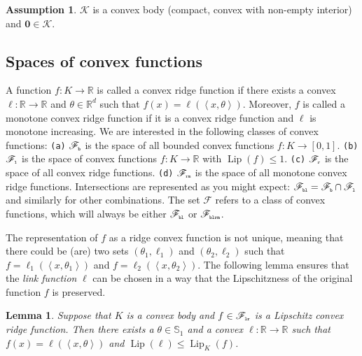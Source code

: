 \documentclass[letter, 12pt]{report}
\newcommand{\pr}{\text{\tiny\texttt{r}}}
\newcommand{\pb}{\text{\tiny\texttt{b}}}
\newcommand{\pl}{\text{\tiny\texttt{l}}}
\renewcommand{\pm}{\text{\tiny\texttt{m}}}
\newcommand{\R}{\mathbb R}
\newcommand{\ip}[1]{\left \langle #1 \right \rangle}
\newcommand{\sphere}{\mathbb{S}}
\newcommand{\cK}{\mathcal K}
\newcommand{\sF}{\mathscr F}
\newcommand{\zeros}{ \bm 0}
\newcommand{\lip}{\operatorname{Lip}}
\newcommand{\1}{\mathbf{1}}
\theoremstyle{plain}
\newtheorem{lemma}[theorem]{Lemma}
\theoremstyle{definition}
\newtheorem{assumption}[theorem]{Assumption}
\theoremstyle{remark}
\begin{document}
\begin{assumption}
    $\cK$ is a convex body (compact, convex with non-empty interior) and $\zeros \in \cK$.
\end{assumption}

\subsection{Spaces of convex functions}
A function $f : K \to \R$ is called a convex ridge function if there exists a convex $\ell : \R \to \R$ and $\theta \in \R^d$ such that
$f(x) = \ell(\ip{x, \theta})$. Moreover, $f$ is called a monotone convex ridge function if it is a convex ridge function and $\ell$ is
monotone increasing.
We are interested in the following classes of convex functions:
\texttt{(a)} $\sF_{\pb}$ is the space of all bounded convex functions $f : K \to [0,1]$.
\texttt{(b)} $\sF_{\pl}$ is the space of convex functions $f : K \to \R$ with $\lip(f) \leq 1$.
\texttt{(c)} $\sF_{\pr}$ is the space of all convex ridge functions.
\texttt{(d)} $\sF_{\pr\pm}$ is the space of all monotone convex ridge functions.
Intersections are represented as you might expect: $\sF_{\pb\pl} = \sF_{\pb} \cap \sF_{\pl}$ and similarly for other combinations.
The set $\sF$ refers to a class of convex functions, which will always be either $\sF_{\pb\pl}$ or $\sF_{\pb\pl\pr\pm}$.

The representation of $f$ as a ridge convex function is not unique,
meaning that there could be (are) two sets $(\theta_1, \ell_1)$ and $(\theta_2, \ell_2)$ such that
$f = \ell_1(\ip{x, \theta_1})$ and $f = \ell_2(\ip{x, \theta_2})$.
The following lemma ensures that the \textit{link function} $\ell$ can be chosen
in a way that the Lipschitzness of the original function $f$ is preserved.
\begin{lemma}\label{lem:lip}
    Suppose that $K$ is a convex body and $f \in \sF_{\pl\pr}$ is a Lipschitz convex ridge function.
    Then there exists a $\theta \in \sphere_1$ and a convex $\ell : \R \to \R$
    such that $f(x) = \ell(\ip{x, \theta})$ and $\lip(\ell) \leq \lip_K(f)$.
\end{lemma}
\end{document}
